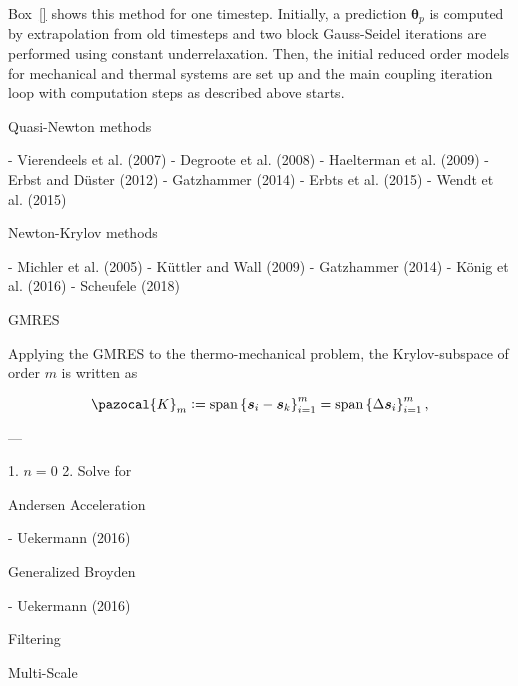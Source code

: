 Box~\ref{} shows this method for one timestep. Initially, a prediction $\boldsymbol \theta_p$ is computed by extrapolation from old timesteps and two block Gauss-Seidel iterations are performed using constant underrelaxation. Then, the initial reduced order models for mechanical and thermal systems are set up and the main coupling iteration loop with computation steps as described above starts.

 Quasi-Newton methods

- Vierendeels et al. (2007)
- Degroote et al. (2008)
- Haelterman et al. (2009)
- Erbst and Düster (2012)
- Gatzhammer (2014)
- Erbts et al. (2015)
- Wendt et al. (2015)

 Newton-Krylov methods

- Michler et al. (2005)
- Küttler and Wall (2009)
- Gatzhammer (2014)
- König et al. (2016)
- Scheufele (2018)

 GMRES

Applying the GMRES to the thermo-mechanical problem, the Krylov-subspace of order $m$ is written as

$$
\pazocal{K}_{m}:=\operatorname{span}\left\{\boldsymbol{s}_{i}-\boldsymbol{s}_{k}\right\}_{i=1}^{m}=\operatorname{span}\left\{\Delta \boldsymbol{s}_{i}\right\}_{i=1}^{m},
$$

---

1. $n = 0$
2. Solve for

 Andersen Acceleration

- Uekermann (2016)

 Generalized Broyden

- Uekermann (2016)

 Filtering

 Multi-Scale
